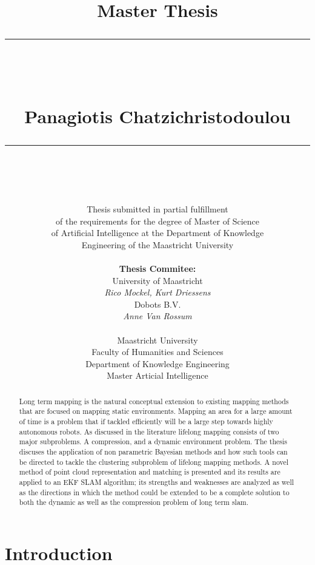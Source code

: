 \documentclass[twoside,hidelinks]{article}
\title{
\Huge{Master Thesis} \\
\noindent\rule{4cm}{0.4pt} \\
\vspace{5mm}
\huge{\selectfont{Towards lifelong mapping in pointclouds}}
\vspace{5mm} \\
\normalsize Panagiotis Chatzichristodoulou \\
\noindent\rule{4cm}{0.4pt} \\
\vspace{5mm}
\fontsize{24pt}{10pt}{Master Thesis DKE 09-16 }} %
\author{
\normalsize Thesis submitted in partial fulfillment\\
\normalsize  of the requirements for the degree of Master of Science \\
\normalsize of Artificial Intelligence at the Department of Knowledge \\
\normalsize  Engineering of the Maastricht University \\
\vspace{5mm} \\
\normalsize \textbf{Thesis Commitee:} \\ 
\normalsize University of Maastricht \\ %
\normalsize \textit{Rico Mockel, Kurt Driessens} \\
\normalsize Dobots B.V.\\
\normalsize \textit{Anne Van Rossum} \\
\vspace{0mm} \\
\normalsize Maastricht University \\
\normalsize Faculty of Humanities and Sciences \\ 
\normalsize Department of Knowledge Engineering \\
\normalsize Master Articial Intelligence \\
}
\begin{document}
\maketitle %

\thispagestyle{fancy} %


\newpage 
\begin{abstract}

\noindent Long term mapping is the natural conceptual extension to existing mapping methods that are focused on mapping static environments. Mapping an area for a large amount of time is a problem that if tackled efficiently will be a large step towards highly autonomous robots. As discussed in the literature lifelong mapping consists of two major subproblems. A compression, and a dynamic environment problem. The thesis discuses the application of non parametric Bayesian methods and how such tools can be directed to tackle the clustering subproblem of lifelong mapping methods. A novel method of point cloud representation and matching is presented and its results are applied to an EKF SLAM algorithm; its strengths and weaknesses are analyzed as well as the directions in which the method could be extended to be a complete solution to both the dynamic as well as the compression problem of long term slam.


\end{abstract}

\newpage
\thispagestyle{empty}
 
\tableofcontents

\listoffigures
 
 
\newpage


\section{Introduction}
\end{document}
